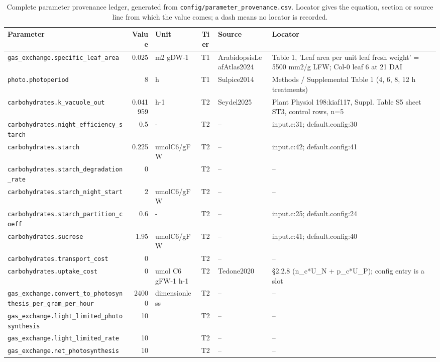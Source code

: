 \begin{table}[!htbp]
\centering
\tiny
\caption{Complete parameter provenance ledger, generated from
\texttt{config/parameter\_provenance.csv}. Locator gives the equation, section or
source line from which the value comes; a dash means no locator is recorded.}
\label{tab:provenance}
\begin{tabular}{@{}p{52mm}rp{20mm}cp{20mm}p{38mm}@{}}
\toprule
Parameter & Value & Unit & Tier & Source & Locator \\
\midrule
\texttt{gas\_exchange.specific\_leaf\_area} & 0.025 & m2 gDW-1 & T1 & ArabidopsisLeafAtlas2024 & Table 1, 'Leaf area per unit leaf fresh weight' = 5500 mm2/g LFW; Col-0 leaf 6 at 21 DAI \\
\texttt{photo.photoperiod} & 8 & h & T1 & Sulpice2014 & Methods / Supplemental Table 1 (4, 6, 8, 12 h treatments) \\
\texttt{carbohydrates.k\_vacuole\_out} & 0.041959 & h-1 & T2 & Seydel2025 & Plant Physiol 198:kiaf117, Suppl. Table S5 sheet ST3, control rows, n=5 \\
\texttt{carbohydrates.night\_efficiency\_starch} & 0.5 & - & T2 & -- & input.c:31; default.config:30 \\
\texttt{carbohydrates.starch} & 0.225 & umolC6/gFW & T2 & -- & input.c:42; default.config:41 \\
\texttt{carbohydrates.starch\_degradation\_rate} & 0 &  & T2 & -- & -- \\
\texttt{carbohydrates.starch\_night\_start} & 2 & umolC6/gFW & T2 & -- & -- \\
\texttt{carbohydrates.starch\_partition\_coeff} & 0.6 & - & T2 & -- & input.c:25; default.config:24 \\
\texttt{carbohydrates.sucrose} & 1.95 & umolC6/gFW & T2 & -- & input.c:41; default.config:40 \\
\texttt{carbohydrates.transport\_cost} & 0 &  & T2 & -- & -- \\
\texttt{carbohydrates.uptake\_cost} & 0 & umol C6 gFW-1 h-1 & T2 & Tedone2020 & \S 2.2.8 (n\_c*U\_N + p\_c*U\_P); config entry is a slot \\
\texttt{gas\_exchange.convert\_to\_photosynthesis\_per\_gram\_per\_hour} & 24000 & dimensionless & T2 & -- & -- \\
\texttt{gas\_exchange.light\_limited\_photosynthesis} & 10 &  & T2 & -- & -- \\
\texttt{gas\_exchange.light\_limited\_rate} & 10 &  & T2 & -- & -- \\
\texttt{gas\_exchange.net\_photosynthesis} & 10 &  & T2 & -- & -- \\

\end{tabular}
\end{table}
